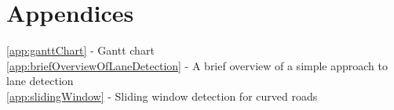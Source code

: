 \documentclass[]{aiaa-tc}%
\begin{document}
\section*{Appendices}
\ref{app:ganttChart} - Gantt chart \\

\ref{app:briefOverviewOfLaneDetection} - A brief overview of a simple approach to lane detection \\

\ref{app:slidingWindow} - Sliding window detection for curved roads \\





%


\appendix
\pagestyle{empty}
 




 
\end{document}
